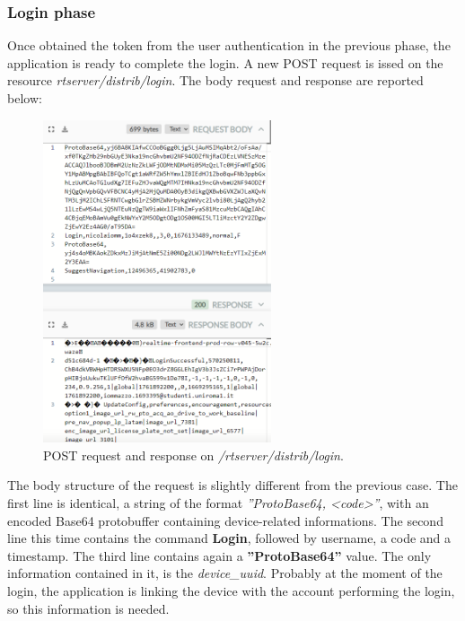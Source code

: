 		\subsubsection{Login phase}
			\par Once obtained the token from the user authentication in the previous phase, the application is ready to complete the login. A new POST request is issed on the resource \textit{rtserver/distrib/login}. The body request and response are reported below:
			\begin{figure}[H]
				\centering
				\includegraphics[width=0.6\textwidth]{images/waze_loginbody.png}
				\caption{POST request and response on \textit{/rtserver/distrib/login}.}
			\end{figure}
			\par The body structure of the request is slightly different from the previous case. \newline
			The first line is identical, a string of the format \textit{''ProtoBase64, <code>''}, with an encoded Base64 protobuffer containing device-related informations. \newline
			The second line this time contains the command \textbf{Login}, followed by username, a code and a timestamp.\newline
			The third line contains again a \textbf{''ProtoBase64''} value. The only information contained in it, is the \textit{device\_uuid}. Probably at the moment of the login, the application is linking the device with the account performing the login, so this information is needed. \newline
